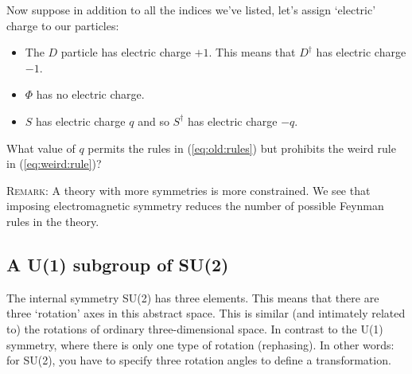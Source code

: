 \documentclass[12pt]{article}
\begin{document}
Now suppose in addition to all the indices we've listed, let's assign `electric' charge to our particles:
\begin{itemize}
	\item The $D$ particle has electric charge $+1$. This means that $D^\dag$ has electric charge $-1$.
	\item $\Phi$ has no electric charge.
	\item $S$ has electric charge $q$ and so $S^\dag$ has electric charge $-q$.
\end{itemize}
What value of $q$ permits the rules in  (\ref{eq:old:rules}) but prohibits the weird rule in (\ref{eq:weird:rule})?

\textsc{Remark}: A theory with more symmetries is more constrained. We see that imposing electromagnetic symmetry reduces the number of possible Feynman rules in the theory.



\subsection{A U(1) subgroup of SU(2)}

The internal symmetry SU(2) has three elements. This means that there are three `rotation' axes in this abstract space. This is similar (and intimately related to) the rotations of ordinary three-dimensional space. In contrast to the U(1) symmetry, where there is only one type of rotation (rephasing). In other words: for SU(2), you have to specify three rotation angles to define a transformation.
\end{document}
